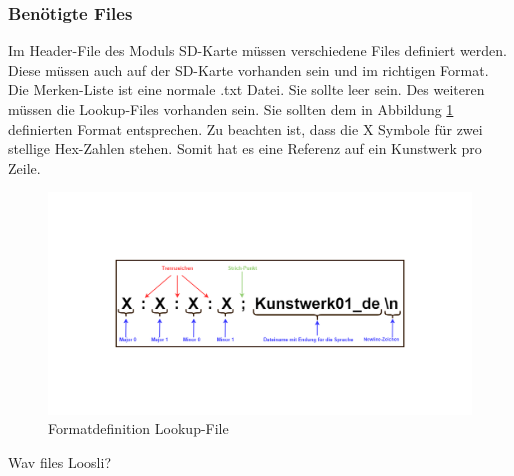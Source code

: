 \subsubsection{Benötigte Files}
Im Header-File des Moduls SD-Karte müssen verschiedene Files definiert werden. Diese müssen auch auf der SD-Karte vorhanden sein und im richtigen Format. Die Merken-Liste ist eine normale .txt Datei. Sie sollte leer sein. Des weiteren müssen die Lookup-Files vorhanden sein. Sie sollten dem in Abbildung \ref{fig:definition_lookup_file} definierten Format entsprechen. Zu beachten ist, dass die X Symbole für zwei stellige Hex-Zahlen stehen. Somit hat es eine Referenz auf ein Kunstwerk pro Zeile.

\begin{figure}[H]
	\begin{center}
		\includegraphics[width=140mm]{data/Definition_picture.png}
		\caption[Formatdefinition Lookup-File]{Formatdefinition Lookup-File} %
		\label{fig:definition_lookup_file}
	\end{center}
\end{figure}

Wav files Loosli?

